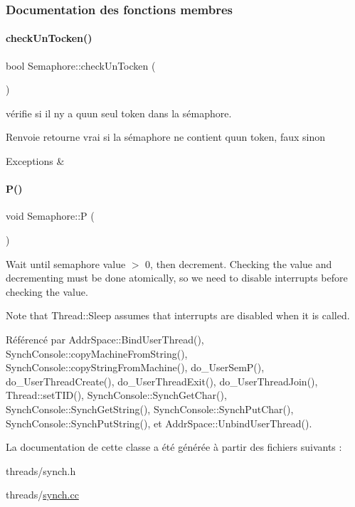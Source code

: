 \subsubsection{Documentation des fonctions membres}
\hypertarget{class_semaphore_ab834b59c88a6061633480c6b7adf7f14}{}\label{class_semaphore_ab834b59c88a6061633480c6b7adf7f14} 
\paragraph{\texorpdfstring{check\+Un\+Tocken()}{checkUnTocken()}}
{\footnotesize\ttfamily bool Semaphore\+::check\+Un\+Tocken (\begin{DoxyParamCaption}{ }\end{DoxyParamCaption})}



vérifie si il n\textquotesingle{}y a qu\textquotesingle{}un seul token dans la sémaphore. 

\begin{DoxyReturn}{Renvoie}
retourne vrai si la sémaphore ne contient qu\textquotesingle{}un token, faux sinon 
\end{DoxyReturn}

\begin{DoxyExceptions}{Exceptions}
{\em } & \\
\hline
\end{DoxyExceptions}
\hypertarget{class_semaphore_a4fee22da0205e3c704b08beaa17e0e7a}{}\label{class_semaphore_a4fee22da0205e3c704b08beaa17e0e7a} 
\paragraph{\texorpdfstring{P()}{P()}}
{\footnotesize\ttfamily void Semaphore\+::P (\begin{DoxyParamCaption}{ }\end{DoxyParamCaption})}



Wait until semaphore value $>$ 0, then decrement. Checking the value and decrementing must be done atomically, so we need to disable interrupts before checking the value. 

Note that Thread\+::\+Sleep assumes that interrupts are disabled when it is called. 

Référencé par Addr\+Space\+::\+Bind\+User\+Thread(), Synch\+Console\+::copy\+Machine\+From\+String(), Synch\+Console\+::copy\+String\+From\+Machine(), do\+\_\+\+User\+Sem\+P(), do\+\_\+\+User\+Thread\+Create(), do\+\_\+\+User\+Thread\+Exit(), do\+\_\+\+User\+Thread\+Join(), Thread\+::set\+T\+I\+D(), Synch\+Console\+::\+Synch\+Get\+Char(), Synch\+Console\+::\+Synch\+Get\+String(), Synch\+Console\+::\+Synch\+Put\+Char(), Synch\+Console\+::\+Synch\+Put\+String(), et Addr\+Space\+::\+Unbind\+User\+Thread().



La documentation de cette classe a été générée à partir des fichiers suivants \+:\begin{DoxyCompactItemize}
\item 
threads/synch.\+h\item 
threads/\hyperlink{synch_8cc}{synch.\+cc}\end{DoxyCompactItemize}

